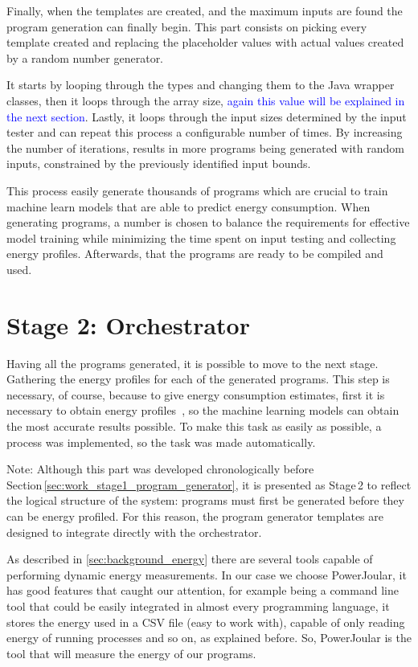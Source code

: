 Finally, when the templates are created, and the maximum inputs are found the program generation can finally begin. This part consists on picking every template created and replacing the placeholder values with actual values created by a random number generator.

It starts by looping through the types and changing them to the Java wrapper classes, then it loops through the array size, \textcolor{blue}{{again this value will be explained in the next section}}. Lastly, it loops through the input sizes determined by the input tester and can repeat this process a configurable number of times. By increasing the number of iterations, results in more programs being generated with random inputs, constrained by the previously identified input bounds.

This process easily generate thousands of programs which are crucial to train machine learn models that are able to predict energy consumption. When generating programs, a number is chosen to balance the requirements for effective model training while minimizing the time spent on input testing and collecting energy profiles. Afterwards, that the programs are ready to be compiled and used.



\section{Stage 2: Orchestrator} \label{sec:work_stage2_orchestrator}

Having all the programs generated, it is possible to move to the next stage. Gathering the energy profiles for each of the generated programs. This step is necessary, of course, because to give energy consumption estimates, first it is necessary to obtain energy profiles~\cite{10.1145/2884781.2884869,8816747}, so the machine learning models can obtain the most accurate results possible. To make this task as easily as possible, a process was implemented, so the task was made automatically. 

Note: Although this part was developed chronologically before Section \ref{sec:work_stage1_program_generator}, it is presented as Stage 2 to reflect the logical structure of the system: programs must first be generated before they can be energy profiled. For this reason, the program generator templates are designed to integrate directly with the orchestrator.

As described in \ref{sec:background_energy} there are several tools capable of performing dynamic energy measurements. In our case we choose PowerJoular, it has good features that caught our attention, for example being a command line tool that could be easily integrated in almost every programming language, it stores the energy used in a CSV file (easy to work with), capable of only reading energy of running processes and so on, as explained before. So, PowerJoular is the tool that will measure the energy of our programs.


